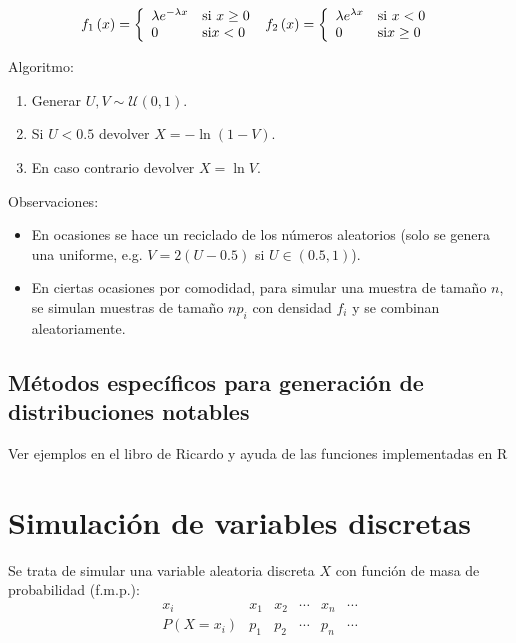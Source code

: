 \documentclass[]{book}
\theoremstyle{definition}
\theoremstyle{definition}
\theoremstyle{definition}
\theoremstyle{remark}
\begin{document}
\[f_{1}\left( x\right) = \left\{ 
\begin{array}{ll}
\lambda e^{-\lambda x} & \text{si } x\geq 0 \\ 
0 & \text{si} x<0
\end{array}
\ \right. \\
f_{2}\left( x\right) = \left\{ 
\begin{array}{ll}
\lambda e^{\lambda x} & \text{si } x<0 \\ 
0 & \text{si} x\geq 0
\end{array}
\ \right.\]

Algoritmo:

\begin{enumerate}
\def\labelenumi{\arabic{enumi}.}
\item
  Generar \(U,V\sim \mathcal{U}\left( 0,1\right)\).
\item
  Si \(U<0.5\) devolver \(X=-\ln \left( 1-V\right)\).
\item
  En caso contrario devolver \(X=\ln V\).
\end{enumerate}

Observaciones:

\begin{itemize}
\item
  En ocasiones se hace un reciclado de los números aleatorios (solo se
  genera una uniforme, e.g. \(V=2(U-0.5)\) si \(U\in (0.5,1)\)).
\item
  En ciertas ocasiones por comodidad, para simular una muestra de tamaño
  \(n\), se simulan muestras de tamaño \(np_{i}\) con densidad \(f_{i}\)
  y se combinan aleatoriamente.
\end{itemize}

\section{Métodos específicos para generación de distribuciones
notables}\label{metodos-especificos-para-generacion-de-distribuciones-notables}

Ver ejemplos en el libro de Ricardo y ayuda de las funciones
implementadas en R

\chapter{Simulación de variables
discretas}\label{simulacion-de-variables-discretas}

Se trata de simular una variable aleatoria discreta \(X\) con función de
masa de probabilidad (f.m.p.): \[\begin{array}{l|ccccc}
 x_{i}  &  x_{1}  &  x_{2}  &  \cdots   &  x_{n}  &  \cdots   \\ \hline
 P\left( X=x_{i}\right)   &  p_{1}  &  p_{2}  &  \cdots   &  p_{n}  &  
\cdots  
\end{array}\]
\end{document}
